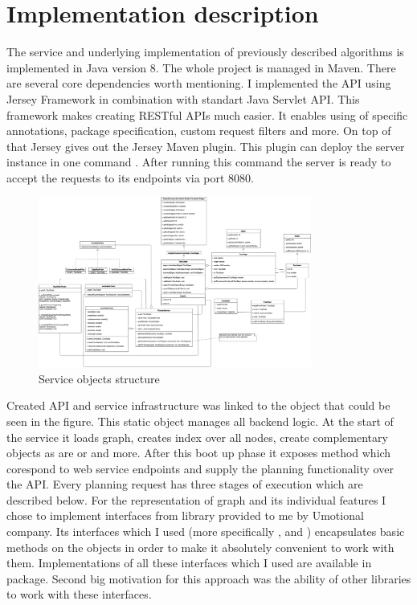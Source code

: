 \documentclass{ctuthesis}
\begin{document}
\section{Implementation description}
The service and underlying implementation of previously described algorithms is implemented in Java version 8. The whole project is managed in Maven. There are several core dependencies worth mentioning. I implemented the API using Jersey Framework in combination with standart Java Servlet API. This framework makes creating RESTful APIs much easier. It enables using of specific annotations, package specification, custom request filters and more. On top of that Jersey gives out the Jersey Maven plugin. This plugin can deploy the server instance in one command . After running this command the server is ready to accept the requests to its endpoints via port 8080. \par
\begin{figure}[H]
	\includegraphics[width=0.8\textwidth]{service.png}
	\caption{Service objects structure}
\end{figure}
Created API and service infrastructure was linked to the  object that could be seen in the figure. This static object manages all backend logic. At the start of the service it loads graph, creates index over all nodes, create complementary objects as are  or  and more. After this boot up phase it exposes method which corespond to web service endpoints and supply the planning functionality over the API. Every planning request has three stages of execution which are described below. For the representation of graph and its individual features I chose to implement interfaces from  library provided to me by Umotional company. Its interfaces which I used (more specifically ,  and ) encapsulates basic methods on the objects in order to make it absolutely convenient to work with them. Implementations of all these interfaces which I used are available in  package. Second big motivation for this approach was the ability of other libraries to work with these interfaces. \par
\end{document}
